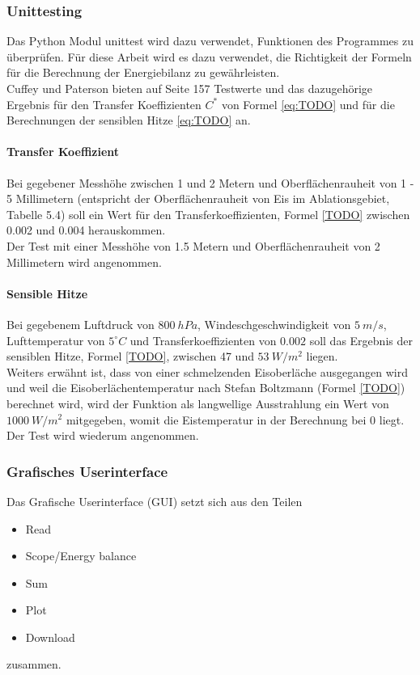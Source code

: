 \documentclass[12pt,a4paper]{article}
\begin{document}
\subsubsection{Unittesting}
Das Python Modul unittest wird dazu verwendet, Funktionen des Programmes zu überprüfen. Für diese Arbeit wird es dazu verwendet, die Richtigkeit der Formeln für die Berechnung der Energiebilanz zu gewährleisten.\\

Cuffey und Paterson bieten auf Seite 157 Testwerte und das dazugehörige Ergebnis für den Transfer Koeffizienten $C^*$ von Formel \ref{eq:TODO} und für die Berechnungen der sensiblen Hitze \ref{eq:TODO} an.


\paragraph{Transfer Koeffizient}

Bei gegebener Messhöhe zwischen 1 und 2 Metern und Oberflächenrauheit von  1 - 5 Millimetern (entspricht der Oberflächenrauheit von Eis im Ablationsgebiet, Tabelle 5.4) soll ein Wert für den Transferkoeffizienten, Formel \ref{TODO} zwischen 0.002 und 0.004 herauskommen.\\

Der Test mit einer Messhöhe von 1.5 Metern und Oberflächenrauheit von 2 Millimetern wird angenommen.

\paragraph{Sensible Hitze}
Bei gegebenem Luftdruck von $800~hPa$, Windeschgeschwindigkeit von $5~m/s$, Lufttemperatur von $5^\circ C$ und Transferkoeffizienten von $0.002$ soll das Ergebnis der sensiblen Hitze, Formel \ref{TODO}, zwischen 47 und $53~W/m^2$ liegen. \\
Weiters erwähnt ist, dass von einer schmelzenden Eisoberläche ausgegangen wird und weil die Eisoberlächentemperatur nach Stefan Boltzmann (Formel \ref{TODO}) berechnet wird, wird der Funktion als langwellige Ausstrahlung ein Wert von $1000~W/m^2$ mitgegeben, womit die Eistemperatur in der Berechnung bei 0 liegt.\\

Der Test wird wiederum angenommen.

\subsubsection{Grafisches Userinterface}
Das Grafische Userinterface (GUI) setzt sich aus den Teilen 
\begin{itemize}
\item Read
\item Scope/Energy balance
\item Sum
\item Plot
\item Download
\end{itemize}
zusammen.
\end{document}
